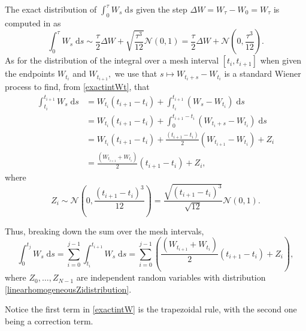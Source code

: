 \documentclass[reqno,12pt]{amsart}
\theoremstyle{plain} %
\theoremstyle{definition} %
\begin{document}
The exact distribution of $\int_0^\tau W_s\;\mathrm{d}s$ given the step $\Delta W = W_\tau - W_0 = W_\tau$ is computed in \cite[Section 14.2]{HanKloeden2017} as
\begin{equation}
    \label{exactintWt}
    \int_0^{\tau} W_s\;\mathrm{d}s \sim \frac{\tau}{2}\Delta W + \sqrt{\frac{\tau^3}{12}}\mathcal{N}(0, 1) = \frac{\tau}{2}\Delta W + \mathcal{N}\left(0, \frac{\tau^3}{12}\right).
\end{equation}
As for the distribution of the integral over a mesh interval $[t_i, t_{i+1}]$ when given the endpoints $W_{t_i}$ and $W_{t_{i+1}},$ we use that $s \mapsto W_{t_i+s} - W_{t_i}$ is a standard Wiener process to find, from \eqref{exactintWt}, that
\begin{align*}
    \int_{t_i}^{t_{i+1}} W_s\;\mathrm{d}s & = W_{t_i}(t_{i+1} - t_i) + \int_{t_i}^{t_{i+1}} (W_s - W_{t_i})\;\mathrm{d}s \\
    & = W_{t_i}(t_{i+1} - t_i) + \int_{0}^{t_{i+1} - t_i} (W_{t_i+s} - W_{t_i})\;\mathrm{d}s \\
    & = W_{t_i}(t_{i+1} - t_i) + \frac{(t_{i+1} - t_i)}{2}(W_{t_{i+1}}-W_{t_{i}}) + Z_i \\
    & = \frac{(W_{t_{i+1}}+W_{t_{i}})}{2}(t_{i+1} - t_i) + Z_i,
\end{align*}
where
\begin{equation}
    \label{linearhomogeneousZidistribution}
    Z_i \sim \mathcal{N}\left(0, \frac{(t_{i+1}- t_i)^3}{12}\right) = \frac{\sqrt{(t_{i+1} - t_i)^3}}{\sqrt{12}}\mathcal{N}(0, 1).
\end{equation}

Thus, breaking down the sum over the mesh intervals,
\begin{equation}
    \label{exactintW}
    \int_0^{t_j} W_s\;\mathrm{d}s = \sum_{i = 0}^{j-1} \int_{t_i}^{t_{i+1}} W_s\;\mathrm{d}s = \sum_{i=0}^{j-1} \left( \frac{(W_{t_{i+1}}+W_{t_{i}})}{2}(t_{i+1} - t_i) + Z_i\right),
\end{equation}
where $Z_0, \ldots, Z_{N-1}$ are independent random variables with distribution \eqref{linearhomogeneousZidistribution}.

Notice the first term in \eqref{exactintW} is the trapezoidal rule, with the second one being a correction term.
\end{document}

